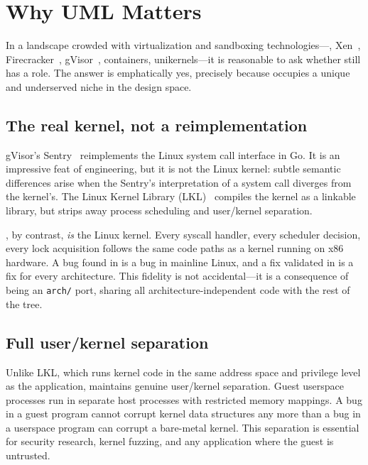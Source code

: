 \section{Why UML Matters}
\label{sec:intro-why}

In a landscape crowded with virtualization and sandboxing technologies---\KVM{},
Xen~\cite{barham2003}, Firecracker~\cite{firecracker}, gVisor~\cite{gvisor},
containers, unikernels---it is reasonable to ask whether \UML{} still
has a role.  The answer is emphatically yes, precisely because \UML{} occupies
a unique and underserved niche in the design space.

\subsection{The real kernel, not a reimplementation}

gVisor's Sentry~\cite{gvisor} reimplements the Linux system call interface in
Go.  It is an impressive feat of engineering, but it is not the Linux kernel:
subtle semantic differences arise when the Sentry's interpretation of a system
call diverges from the kernel's.  The Linux Kernel Library
(\textsc{LKL})~\cite{lkl} compiles the kernel as a linkable library, but
strips away process scheduling and user/kernel separation.

\UML{}, by contrast, \emph{is} the Linux kernel.  Every syscall handler,
every scheduler decision, every lock acquisition follows the same code paths
as a kernel running on x86 hardware.  A bug found in \UML{} is a bug in
mainline Linux, and a fix validated in \UML{} is a fix for every architecture.
This fidelity is not accidental---it is a consequence of \UML{} being an
\texttt{arch/} port, sharing all architecture-independent code with the rest
of the tree.

\subsection{Full user/kernel separation}

Unlike \textsc{LKL}, which runs kernel code in the same address space and
privilege level as the application, \UML{} maintains genuine user/kernel
separation.  Guest userspace processes run in separate host processes with
restricted memory mappings.  A bug in a guest program cannot corrupt \UML{}
kernel data structures any more than a bug in a userspace program can corrupt
a bare-metal kernel.  This separation is essential for security research,
kernel fuzzing, and any application where the guest is untrusted.

